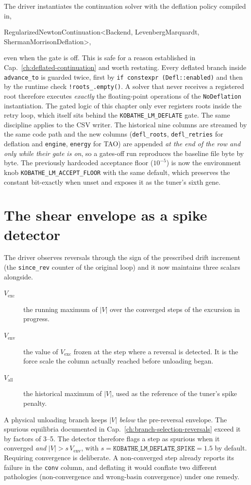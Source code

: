 The driver instantiates the continuation solver with the deflation policy
compiled in,
\begin{center}
\ttfamily RegularizedNewtonContinuation<Backend, LevenbergMarquardt,
ShermanMorrisonDeflation>,
\end{center}
even when the gate is off. This is safe for a reason established in
Cap.~\ref{ch:deflated-continuation} and worth restating. Every deflated
branch inside \texttt{advance\_to} is guarded twice, first by
\texttt{if constexpr (Defl::enabled)} and then by the runtime check
\texttt{!roots\_.empty()}. A solver that never receives a registered root
therefore executes \emph{exactly} the floating-point operations of the
\texttt{NoDeflation} instantiation. The gated logic of this chapter only
ever registers roots inside the retry loop, which itself sits behind the
\texttt{KOBATHE\_LM\_DEFLATE} gate. The same discipline applies to the
CSV writer. The historical nine columns are streamed by the same code
path and the new columns (\texttt{defl\_roots}, \texttt{defl\_retries}
for deflation and \texttt{engine}, \texttt{energy} for TAO) are appended
\emph{at the end of the row and only while their gate is on}, so a
gates-off run reproduces the baseline file byte by byte. The previously
hardcoded acceptance floor ($10^{-5}$) is now the environment knob
\texttt{KOBATHE\_LM\_ACCEPT\_FLOOR} with the same default, which
preserves the constant bit-exactly when unset and exposes it as the
tuner's sixth gene.

\section{The shear envelope as a spike detector}
\label{sec:drv-envelope}

The driver observes reversals through the sign of the prescribed drift
increment (the \texttt{since\_rev} counter of the original loop) and it
now maintains three scalars alongside.
%
\begin{description}
  \item[\(V_{\mathrm{exc}}\)] the running maximum of $|V|$ over the
        converged steps of the excursion in progress.
  \item[\(V_{\mathrm{env}}\)] the value of \(V_{\mathrm{exc}}\) frozen at
        the step where a reversal is detected. It is the force scale the
        column actually reached before unloading began.
  \item[\(V_{\mathrm{all}}\)] the historical maximum of $|V|$, used as
        the reference of the tuner's spike penalty.
\end{description}
%
A physical unloading branch keeps $|V|$ \emph{below} the pre-reversal
envelope. The spurious equilibria documented in
Cap.~\ref{ch:branch-selection-reversals} exceed it by factors of 3--5.
The detector therefore flags a step as spurious when it converged
\emph{and} $|V| > s\,V_{\mathrm{env}}$, with
$s=\texttt{KOBATHE\_LM\_DEFLATE\_SPIKE}=1.5$ by default. Requiring
convergence is deliberate. A non-converged step already reports its
failure in the \texttt{conv} column, and deflating it would conflate two
different pathologies (non-convergence and wrong-basin convergence) under
one remedy.

